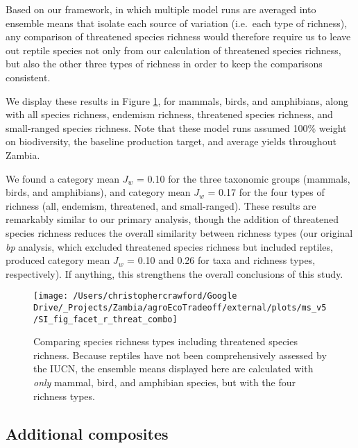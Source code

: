 \documentclass[
]{article}
\begin{document}
Based on our framework, in which multiple model runs are averaged into ensemble means that isolate each source of variation (i.e.~each type of richness), any comparison of threatened species richness would therefore require us to leave out reptile species not only from our calculation of threatened species richness, but also the other three types of richness in order to keep the comparisons consistent.

We display these results in Figure \ref{fig:threat-richness}, for mammals, birds, and amphibians, along with all species richness, endemism richness, threatened species richness, and small-ranged species richness. Note that these model runs assumed 100\% weight on biodiversity, the baseline production target, and average yields throughout Zambia.

We found a category mean \(J_w\) = 0.10 for the three taxonomic groups (mammals, birds, and amphibians), and category mean \(J_w\) = 0.17 for the four types of richness (all, endemism, threatened, and small-ranged). These results are remarkably similar to our primary analysis, though the addition of threatened species richness reduces the overall similarity between richness types (our original \emph{bp} analysis, which excluded threatened species richness but included reptiles, produced category mean \(J_w\) = 0.10 and 0.26 for taxa and richness types, respectively). If anything, this strengthens the overall conclusions of this study.



\begin{figure}

{\centering \texttt{[image: /Users/christophercrawford/Google Drive/\_Projects/Zambia/agroEcoTradeoff/external/plots/ms\_v5/SI\_fig\_facet\_r\_threat\_combo]} 

}

\caption{Comparing species richness types including threatened species richness. Because reptiles have not been comprehensively assessed by the IUCN, the ensemble means displayed here are calculated with \emph{only} mammal, bird, and amphibian species, but with the four richness types.}\label{fig:threat-richness}
\end{figure}

\hypertarget{additional-composites}{%
\subsection{Additional composites}\label{additional-composites}}
\end{document}
